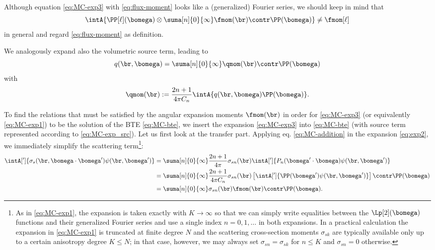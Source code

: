 Although equation \eqref{eq:MC-exp3} with \eqref{eq:flux-moment} looks like a (generalized) Fourier series, we should 
keep in mind that
$$
  \intA{\PP[\ell](\bomega)\otimes\suma[n]{0}{\infty}\fmom(\br)\contr\PP(\bomega)} \neq \fmom[\ell]
$$
in general and regard \eqref{eq:flux-moment} as definition.

We analogously expand also the volumetric source term, leading to 
\begin{equation}\label{eq:MC-exp_src}
  q(\br,\bomega) = \suma[n]{0}{\infty}\qmom(\br)\contr\PP(\bomega)
\end{equation}
with
\begin{equation*}
  \qmom(\br) := \frac{2n+1}{4\pi C_n}\intA{q(\br,\bomega)\PP(\bomega)}.
\end{equation*}

To find the relations that must be satisfied by the angular expansion moments $\fmom(\br)$ in order for
\eqref{eq:MC-exp3} (or equivalently \eqref{eq:MC-exp1}) to be the solution of the BTE \eqref{eq:MC-bte}, we insert the
expansion \eqref{eq:MC-exp3} into \eqref{eq:MC-bte} (with source term represented according to \eqref{eq:MC-exp_src}).
Let us first look at the transfer part.
Applying eq. \eqref{eq:MC-addition} in the expansion \eqref{eq:exp2}, we immediately simplify the scattering
term\footnote{As in \eqref{eq:MC-exp1}, the expansion is taken exactly with $K\to\infty$ so that we can simply write
equalities between the $\Lp[2](\bomega)$ functions and their generalized Fourier series and use a single index $n =
0,1,\ldots$ in both expansions. In a practical calculation the expansion in \eqref{eq:MC-exp1} is truncated at finite
degree $N$ and the scattering cross-section moments $\sigma_{sk}$ are typically available only up to a certain
anisotropy degree $K \leq N$; in that case, however, we may always set $\sigma_{sn} = \sigma_{sk}$ for $n \leq K$ and
$\sigma_{sn} = 0$ otherwise.}:
\begin{equation*}%
  \begin{aligned}
  \intA[']{\sigma_s(\br,\bomega\cdot\bomega')\psi(\br,\bomega')} &= 
    \suma[n]{0}{\infty}
    \frac{2n+1}{4\pi}\sigma_{sn}(\br)\intA[']{P_n(\bomega'\cdot\bomega)\psi(\br,\bomega')}\\
    & = \suma[n]{0}{\infty}
    \frac{2n+1}{4\pi C_n}\sigma_{sn}(\br)\left[\intA[']{\PP(\bomega')\psi(\br,\bomega')}\right]\contr\PP(\bomega)\\
    & = \suma[n]{0}{\infty}
    \sigma_{sn}(\br)\fmom(\br)\contr\PP(\bomega).
    \end{aligned}
\end{equation*}

